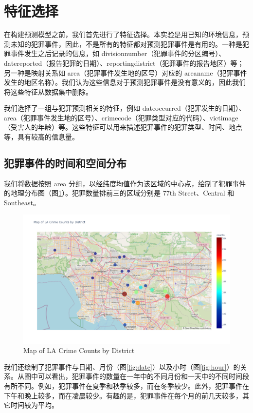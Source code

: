 \documentclass{article}
\begin{document}
\section{特征选择}
在构建预测模型之前，我们首先进行了特征选择。本实验是用已知的环境信息，预测未知的犯罪事件，因此，不是所有的特征都对预测犯罪事件是有用的。一种是犯罪事件发生之后记录的信息，如 division\textunderscore{}number（犯罪事件的分区编号）、date\textunderscore{}reported（报告犯罪的日期）、reporting\textunderscore{}district（犯罪事件的报告地区）等；另一种是映射关系如 area（犯罪事件发生地的区号）对应的 area\textunderscore{}name（犯罪事件发生的地区名称）。我们认为这些信息对于预测犯罪事件是没有意义的，因此我们将这些特征从数据集中删除。

我们选择了一组与犯罪预测相关的特征，例如 date\textunderscore{}occurred（犯罪发生的日期）、area（犯罪事件发生地的区号）、crime\textunderscore{}code（犯罪类型对应的代码）、victim\textunderscore{}age（受害人的年龄）等。这些特征可以用来描述犯罪事件的犯罪类型、时间、地点等，具有较高的信息量。

\subsection{犯罪事件的时间和空间分布}
我们将数据按照 area 分组，以经纬度均值作为该区域的中心点，绘制了犯罪事件的地理分布图（图\ref{fig:map}）。犯罪数量排前三的区域分别是 77th Street、Central 和 Southeast。

\begin{figure}[H]
    \centering
    \includegraphics[width=1\textwidth]{../pic/map.png}
    \caption{Map of LA Crime Counts by District}
    \label{fig:map}
\end{figure}

我们还绘制了犯罪事件与日期、月份（图\ref{fig:date}）以及小时（图\ref{fig:hour}）的关系。从图中可以看出，犯罪事件的数量在一年中的不同月份和一天中的不同时间段有所不同。例如，犯罪事件在夏季和秋季较多，而在冬季较少。此外，犯罪事件在下午和晚上较多，而在凌晨较少。有趣的是，犯罪事件在每个月的前几天较多，其它时间较为平均。
\end{document}
